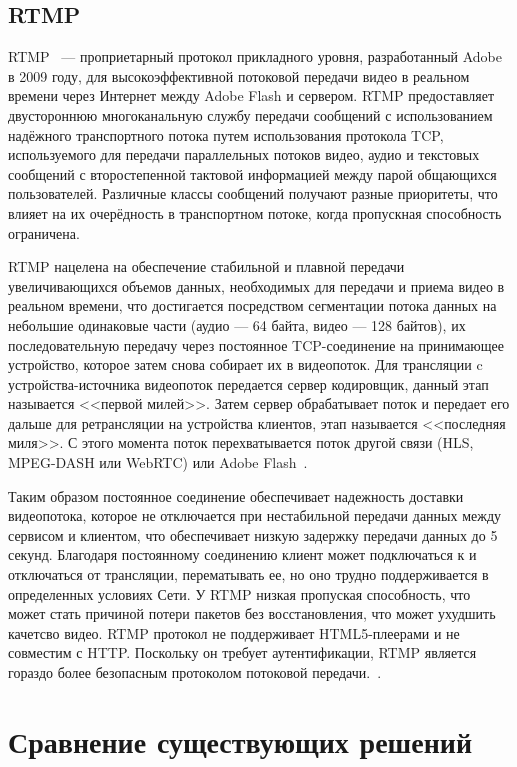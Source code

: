 \section{RTMP}

RTMP~\cite{rtmp_adobe} ---  проприетарный протокол прикладного уровня, разработанный Adobe в 2009 году, для высокоэффективной потоковой передачи видео в реальном времени через Интернет между Adobe Flash и сервером.
RTMP предоставляет двустороннюю многоканальную службу передачи сообщений с использованием надёжного транспортного потока путем использования протокола TCP, используемого для передачи параллельных потоков видео, аудио и текстовых сообщений с второстепенной тактовой информацией между парой общающихся пользователей.
Различные классы сообщений получают разные приоритеты, что влияет на их очерёдность в транспортном потоке, когда пропускная способность ограничена.

RTMP нацелена на обеспечение стабильной и плавной передачи увеличивающихся объемов данных, необходимых для передачи и приема видео в реальном времени, что достигается посредством сегментации потока данных на небольшие одинаковые части (аудио --- 64 байта, видео --- 128 байтов), их последовательную передачу через постоянное TCP-соединение на принимающее устройство, которое затем снова собирает их в видеопоток. 
Для трансляции c устройства-источника  видеопоток передается сервер кодировщик, данный этап называется <<первой милей>>. 
Затем сервер обрабатывает поток и передает его дальше для ретрансляции на устройства клиентов, этап называется <<последняя миля>>.
С этого момента поток перехватывается поток другой связи (HLS, MPEG-DASH или WebRTC) или Adobe Flash~\cite{rtmp_adobe}.

Таким образом постоянное соединение обеспечивает надежность доставки видеопотока, которое не отключается при нестабильной передачи данных между сервисом и клиентом, что обеспечивает низкую задержку передачи данных до 5 секунд. 
Благодаря постоянному соединению клиент может подключаться к и отключаться от трансляции, перематывать ее, но оно трудно поддерживается в определенных условиях Сети.
У RTMP низкая пропуская способность, что может стать причиной потери пакетов без восстановления, что может ухудшить качетсво видео.
RTMP протокол не поддерживает HTML5-плеерами и не совместим с HTTP. Поскольку он требует аутентификации, RTMP является гораздо более безопасным протоколом потоковой передачи.~\cite{rtmp_adobe}.

\chapter{Сравнение существующих решений}

